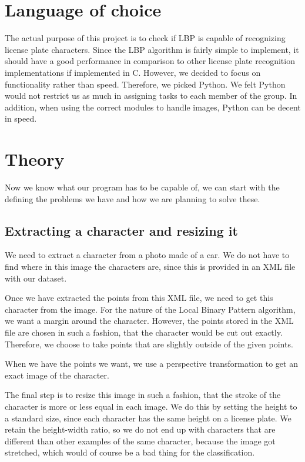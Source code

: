 \documentclass[a4paper]{article}
\begin{document}
\section{Language of choice}

The actual purpose of this project is to check if LBP is capable of recognizing
license plate characters. Since the LBP algorithm is fairly simple to
implement, it should have a good performance in comparison to other license
plate recognition implementations if implemented in C. However, we decided to
focus on functionality rather than speed. Therefore, we picked Python. We felt
Python would not restrict us as much in assigning tasks to each member of the
group. In addition, when using the correct modules to handle images, Python can
be decent in speed.

\section{Theory}

Now we know what our program has to be capable of, we can start with the
defining the problems we have and how we are planning to solve these.

\subsection{Extracting a character and resizing it}

We need to extract a character from a photo made of a car. We do not have to
find where in this image the characters are, since this is provided in an XML
file with our dataset.

Once we have extracted the points from this XML file, we need to get this
character from the image. For the nature of the Local Binary Pattern algorithm,
we want a margin around the character. However, the points stored in the XML
file are chosen in such a fashion, that the character would be cut out exactly.
Therefore, we choose to take points that are slightly outside of the given
points.

When we have the points we want, we use a perspective transformation to get
an exact image of the character.

The final step is to resize this image in such a fashion, that the stroke
of the character is more or less equal in each image. We do this by setting
the height to a standard size, since each character has the same height on a
license plate. We retain the height-width ratio, so we do not end up with
characters that are different than other examples of the same character,
because the image got stretched, which would of course be a bad thing for
the classification.
\end{document}
